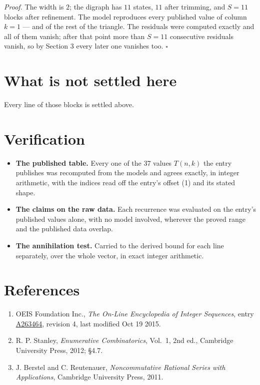 \documentclass[11pt]{article}
\theoremstyle{definition}
\begin{document}
{\itshape Proof.} The width is $2$; the digraph has $11$ states, $11$ after trimming, and $S = 11$ blocks after refinement. The model reproduces every published value of column $k = 1$ --- and of the rest of the triangle. The residuals were computed exactly and all of them vanish; after that point more than $S = 11$ consecutive residuals vanish, so by Section 3 every later one vanishes too. $\square$

\section{What is not settled here}

Every line of those blocks is settled above.

\section{Verification}

\begin{itemize}

\item {\bfseries The published table.} Every one of the 37 values $T(n,k)$ the entry publishes was recomputed from the models and agrees exactly, in integer arithmetic, with the indices read off the entry's offset (1) and its stated shape.

\item {\bfseries The claims on the raw data.} Each recurrence was evaluated on the entry's published values alone, with no model involved, wherever the proved range and the published data overlap.

\item {\bfseries The annihilation test.} Carried to the derived bound for each line separately, over the whole vector, in exact integer arithmetic.

\end{itemize}

\section{References}

\begin{enumerate}

\item OEIS Foundation Inc., \emph{The On-Line Encyclopedia of Integer Sequences}, entry \href{https://oeis.org/A263464}{A263464}, revision 4, last modified Oct 19 2015.

\item R. P. Stanley, \emph{Enumerative Combinatorics}, Vol.~1, 2nd ed., Cambridge University Press, 2012; \S4.7.

\item J. Berstel and C. Reutenauer, \emph{Noncommutative Rational Series with Applications}, Cambridge University Press, 2011.

\end{enumerate}
\end{document}
